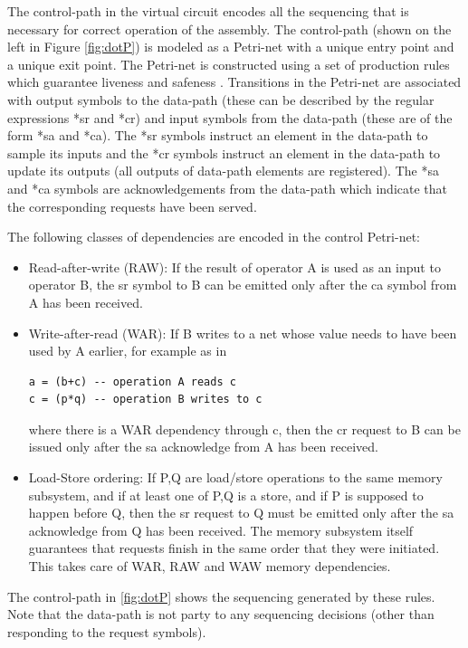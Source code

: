 \documentclass[conference]{IEEEtran}
\begin{document}

The control-path in the virtual circuit encodes
all the sequencing that is necessary for correct
operation of the assembly.
The control-path (shown on the left
in Figure \ref{fig:dotP}) is modeled as a Petri-net with
a unique entry point and a unique exit point.  The Petri-net
is constructed using a set of production rules which guarantee
liveness and safeness \cite{ahirDsd2010}.  Transitions in the Petri-net
are associated with output symbols to the data-path (these can
be described by the regular expressions *sr and *cr)
and input symbols from the data-path (these are of the form *sa and
*ca).  The *sr symbols instruct an element in the data-path to
sample its inputs and the *cr symbols instruct an element in the
data-path to update its outputs (all outputs of data-path elements
are registered).  The *sa and *ca symbols are acknowledgements
from the data-path which indicate that the corresponding requests
have been served.  

The following classes of dependencies are
encoded in the control Petri-net:
\begin{itemize}
\item Read-after-write (RAW):  If the result of operator A is used
as an input to operator B, the sr symbol to B can be emitted only after
the ca symbol from A has been received.
\item Write-after-read (WAR): If B writes to a net whose value needs
to have been used by A earlier, for example as in
\begin{verbatim}
a = (b+c) -- operation A reads c
c = (p*q) -- operation B writes to c
\end{verbatim}
where there is a WAR dependency through c,
 then the cr request to B can be
issued only after the sa acknowledge from A has been received.
\item Load-Store ordering:  If P,Q are load/store operations
to the same memory subsystem, and if at least one of P,Q is a
store, and if P is supposed to happen before Q,  then the sr request
to Q must be emitted only after the sa acknowledge from Q
has been received.  The memory subsystem itself guarantees
that requests finish in the same order that they were
initiated.  This takes care of WAR, RAW and WAW memory
dependencies.
\end{itemize}

The control-path in \ref{fig:dotP} shows the sequencing
generated by these rules.  Note that the data-path
is not party to any sequencing decisions (other than
responding to the request symbols). 
\end{document}

